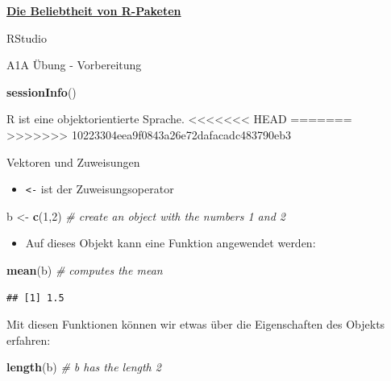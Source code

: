 \documentclass[ignorenonframetext,]{beamer}
\newenvironment{Shaded}{\begin{snugshade}}{\end{snugshade}}
\newcommand{\KeywordTok}[1]{\textcolor[rgb]{0.13,0.29,0.53}{\textbf{#1}}}
\newcommand{\DecValTok}[1]{\textcolor[rgb]{0.00,0.00,0.81}{#1}}
\newcommand{\StringTok}[1]{\textcolor[rgb]{0.31,0.60,0.02}{#1}}
\newcommand{\CommentTok}[1]{\textcolor[rgb]{0.56,0.35,0.01}{\textit{#1}}}
\newcommand{\NormalTok}[1]{#1}
\newcommand{\CommentTok}[1]{\textcolor[rgb]{0.56,0.35,0.01}{\textit{#1}}}
\newcommand{\DecValTok}[1]{\textcolor[rgb]{0.00,0.00,0.81}{#1}}
\newcommand{\KeywordTok}[1]{\textcolor[rgb]{0.13,0.29,0.53}{\textbf{#1}}}
\newcommand{\NormalTok}[1]{#1}
\newcommand{\StringTok}[1]{\textcolor[rgb]{0.31,0.60,0.02}{#1}}
\providecommand{\tightlist}{%
  \setlength{\itemsep}{0pt}\setlength{\parskip}{0pt}}
\begin{document}
\begin{frame}{\href{https://gallery.shinyapps.io/cran-gauge/}{\textbf{Die
Beliebtheit von R-Paketen}}}
\begin{frame}{RStudio}
\begin{frame}[fragile]{A1A Übung - Vorbereitung}
\begin{Shaded}
\begin{Highlighting}[]
\KeywordTok{sessionInfo}\NormalTok{()}
\end{Highlighting}
\end{Shaded}

\end{frame}

\begin{frame}[fragile]{R ist eine objektorientierte Sprache.}
<<<<<<< HEAD
=======
\protect\hypertarget{r-ist-eine-objektorientierte-sprache.}{}
>>>>>>> 10223304eea9f0843a26e72dafacadc483790eb3

\begin{block}{Vektoren und Zuweisungen}

\begin{itemize}
\tightlist
\item
  \texttt{\textless{}-} ist der Zuweisungsoperator
\end{itemize}

\begin{Shaded}
\begin{Highlighting}[]
\NormalTok{b <-}\StringTok{ }\KeywordTok{c}\NormalTok{(}\DecValTok{1}\NormalTok{,}\DecValTok{2}\NormalTok{) }\CommentTok{# create an object with the numbers 1 and 2}
\end{Highlighting}
\end{Shaded}

\begin{itemize}
\tightlist
\item
  Auf dieses Objekt kann eine Funktion angewendet werden:
\end{itemize}

\begin{Shaded}
\begin{Highlighting}[]
\KeywordTok{mean}\NormalTok{(b) }\CommentTok{# computes the mean}
\end{Highlighting}
\end{Shaded}

\begin{verbatim}
## [1] 1.5
\end{verbatim}

Mit diesen Funktionen können wir etwas über die Eigenschaften des
Objekts erfahren:

\begin{Shaded}
\begin{Highlighting}[]
\KeywordTok{length}\NormalTok{(b) }\CommentTok{# b has the length 2}
\end{Highlighting}
\end{Shaded}


\end{block}
\end{frame}
\end{frame}
\end{frame}
\end{document}

